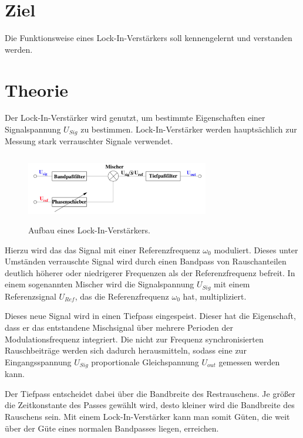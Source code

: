 \section{Ziel}
\label{sec:Ziel}

Die Funktionsweise eines Lock-In-Verstärkers soll kennengelernt und verstanden werden. 

\section{Theorie}
\label{sec:Theorie}

Der Lock-In-Verstärker wird genutzt, um bestimmte Eigenschaften einer Signalspannung 
$U_{Sig}$ zu bestimmen. Lock-In-Verstärker werden hauptsächlich zur Messung stark
verrauschter Signale verwendet.

\begin{figure}
    \centering
    \includegraphics[width=8cm, height=3cm]{build/lockin1.png}
    \caption{Aufbau eines Lock-In-Verstärkers.}
\end{figure}

\noindent Hierzu wird das das Signal mit einer Referenzfrequenz $\omega_0$ moduliert.
Dieses unter Umständen verrauschte Signal wird durch einen Bandpass von Rauschanteilen 
deutlich höherer oder niedrigerer Frequenzen als der Referenzfrequenz befreit.
In einem sogenannten Mischer wird die Signalspannung $U_{Sig}$ mit einem Referenzsignal 
$U_{Ref}$, das die Referenzfrequenz $\omega_0$ hat, multipliziert. 

\noindent Dieses neue Signal wird in einen Tiefpass eingespeist. Dieser hat die 
Eigenschaft, dass er das entstandene Mischsignal über mehrere Perioden der 
Modulationsfrequenz integriert.
Die nicht zur Frequenz synchronisierten Rauschbeiträge werden sich dadurch 
herausmitteln, sodass eine zur Eingangsspannung $U_{Sig}$ proportionale Gleichspannung 
$U_{out}$ gemessen werden kann. 

\noindent Der Tiefpass entscheidet dabei über die Bandbreite des Restrauschens. 
Je größer die Zeitkonstante des Passes gewählt wird, desto kleiner wird die Bandbreite 
des Rauschens sein. Mit einem Lock-In-Verstärker kann man somit Güten, 
die weit über der Güte eines normalen Bandpasses liegen, erreichen.


